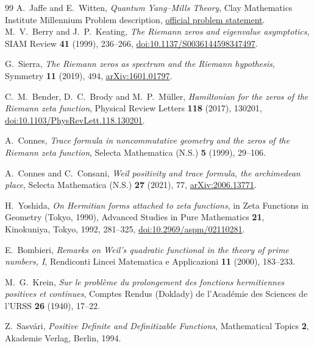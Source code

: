\begin{thebibliography}{99}
A.~Jaffe and E.~Witten, \emph{Quantum Yang--Mills Theory},
Clay Mathematics Institute Millennium Problem description,
\href{https://www.claymath.org/wp-content/uploads/2022/06/yangmills.pdf}{official problem statement}.
M.~V.~Berry and J.~P.~Keating, \emph{The Riemann zeros and eigenvalue
asymptotics}, SIAM Review \textbf{41} (1999), 236--266,
\href{https://doi.org/10.1137/S0036144598347497}{doi:10.1137/S0036144598347497}.

G.~Sierra, \emph{The Riemann zeros as spectrum and the Riemann hypothesis},
Symmetry \textbf{11} (2019), 494,
\href{https://arxiv.org/abs/1601.01797}{arXiv:1601.01797}.

C.~M.~Bender, D.~C.~Brody and M.~P.~M\"uller, \emph{Hamiltonian for the zeros
of the Riemann zeta function}, Physical Review Letters \textbf{118} (2017),
130201,
\href{https://doi.org/10.1103/PhysRevLett.118.130201}{doi:10.1103/PhysRevLett.118.130201}.

A.~Connes, \emph{Trace formula in noncommutative geometry and the zeros of
the Riemann zeta function}, Selecta Mathematica (N.S.) \textbf{5} (1999),
29--106.

A.~Connes and C.~Consani, \emph{Weil positivity and trace formula, the
archimedean place}, Selecta Mathematica (N.S.) \textbf{27} (2021), 77,
\href{https://arxiv.org/abs/2006.13771}{arXiv:2006.13771}.

H.~Yoshida, \emph{On Hermitian forms attached to zeta functions},
in Zeta Functions in Geometry (Tokyo, 1990), Advanced Studies in Pure
Mathematics \textbf{21}, Kinokuniya, Tokyo, 1992, 281--325,
\href{https://doi.org/10.2969/aspm/02110281}{doi:10.2969/aspm/02110281}.

E.~Bombieri, \emph{Remarks on Weil's quadratic functional in the theory of
prime numbers, I}, Rendiconti Lincei Matematica e Applicazioni \textbf{11}
(2000), 183--233.

M.~G.~Krein, \emph{Sur le probl\`eme du prolongement des fonctions
hermitiennes positives et continues}, Comptes Rendus (Doklady) de
l'Acad\'emie des Sciences de l'URSS \textbf{26} (1940), 17--22.

Z.~Sasv\'ari, \emph{Positive Definite and Definitizable Functions},
Mathematical Topics \textbf{2}, Akademie Verlag, Berlin, 1994.

\end{thebibliography}
